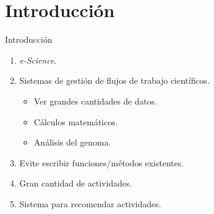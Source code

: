 \section{Introducción}

\begin{frame}		
	\begin{block}{Introducción}
		 \begin{enumerate}
		  \item \emph{e-Science}.
		  \item Sistemas de gestión de flujos de trabajo científicos.
			  \begin{itemize}
			  	\item Ver grandes cantidades de datos.
				\item Cálculos matemáticos.
				\item Análisis del genoma.
			  \end{itemize}
		  \item Evite escribir funciones/métodos existentes.
		  \item Gran cantidad de actividades.
		  \item Sistema para recomendar actividades.
		 \end{enumerate}
	\end{block}
\end{frame}